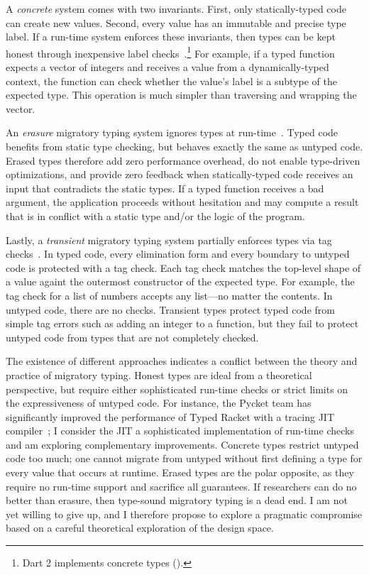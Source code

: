 A \emph{concrete}\/ system comes with two invariants.
First, only statically-typed code can create new values.
Second, every value has an immutable and precise type label.
If a run-time system enforces these invariants, then types can be kept honest
 through inexpensive label checks~\cite{mt-oopsla-2017,wnlov-popl-2010,bmt-ecoop-2010}.\footnote{Dart 2 implements concrete types ().}
For example, if a typed function expects a vector of integers and receives
 a value from a dynamically-typed context, the function can check whether the
 value's label is a subtype of the expected type.
This operation is much simpler than traversing and wrapping the vector.

An \emph{erasure}\/ migratory typing system ignores types at run-time~\cite{bat-ecoop-2014,bg-oopsla-1993,s-lisp-1990}.
Typed code benefits from static type checking, but behaves exactly the same
 as untyped code.
Erased types therefore add zero performance overhead, do not enable
 type-driven optimizations, and provide zero feedback
 when statically-typed code receives an input that contradicts the static
 types.
If a typed function receives a bad argument, the application proceeds without
 hesitation and may compute a result that is in conflict with a
 static type and/or the logic of the program.

Lastly, a \emph{transient}\/ migratory typing system partially enforces types
 via tag checks~\cite{vss-popl-2017,v-thesis-2019}.
In typed code, every elimination form and every boundary to untyped code
 is protected with a tag check.
Each tag check matches the top-level shape of a value againt the outermost
 constructor of the expected type.
For example, the tag check for a
 list of numbers accepts any list---no matter the contents.
In untyped code, there are no checks.
Transient types protect typed code from simple
 tag errors such as adding an integer to a function, but they fail
 to protect untyped code from types that are not completely checked.

The existence of different approaches indicates a conflict between the theory
 and practice of migratory typing.
Honest types are ideal from a theoretical perspective, but require either
 sophisticated run-time checks or strict limits on the expressiveness of
 untyped code.
For instance, the Pycket team has significantly improved the performance
 of Typed Racket with a tracing JIT compiler~\cite{bbst-oopsla-2017};
 I consider the JIT a sophisticated implementation of run-time checks
 and am exploring complementary improvements.
Concrete types restrict untyped code too much; one cannot migrate from untyped
 without first defining a type for every value that occurs at runtime.
Erased types are the polar opposite, as they require no run-time support
 and sacrifice all guarantees.
If researchers can do no better than erasure, then
 type-sound migratory typing is a dead end.
I am not yet willing to give up, and I therefore propose to explore a pragmatic
 compromise based on a careful theoretical exploration of the design space.
